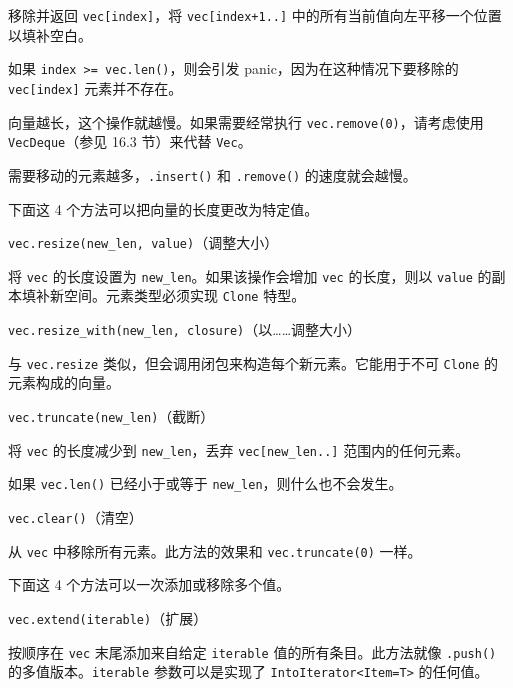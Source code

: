 移除并返回 \texttt{vec[index]}，将 \texttt{vec[index+1..]} 中的所有当前值向左平移一个位置以填补空白。

如果 \texttt{index >= vec.len()}，则会引发 panic，因为在这种情况下要移除的 \texttt{vec[index]} 元素并不存在。

向量越长，这个操作就越慢。如果需要经常执行 \texttt{vec.remove(0)}，请考虑使用 \texttt{VecDeque}（参见 16.3 节）来代替 \texttt{Vec}。

需要移动的元素越多，\texttt{.insert()} 和 \texttt{.remove()} 的速度就会越慢。

下面这 4 个方法可以把向量的长度更改为特定值。

\begin{myNote}
\texttt{vec.resize(new\_len, value)}（调整大小）
\end{myNote}

将 \texttt{vec} 的长度设置为 \texttt{new\_len}。如果该操作会增加 \texttt{vec} 的长度，则以 \texttt{value} 的副本填补新空间。元素类型必须实现 \texttt{Clone} 特型。

\begin{myNote}
\texttt{vec.resize\_with(new\_len, closure)}（以……调整大小）
\end{myNote}

与 \texttt{vec.resize} 类似，但会调用闭包来构造每个新元素。它能用于不可 \texttt{Clone} 的元素构成的向量。

\begin{mySidenote}
\texttt{vec.truncate(new\_len)}（截断）
\end{mySidenote}

将 \texttt{vec} 的长度减少到 \texttt{new\_len}，丢弃 \texttt{vec[new\_len..]} 范围内的任何元素。

如果 \texttt{vec.len()} 已经小于或等于 \texttt{new\_len}，则什么也不会发生。

\begin{mySidenote}
\texttt{vec.clear()}（清空）
\end{mySidenote}

从 \texttt{vec} 中移除所有元素。此方法的效果和 \texttt{vec.truncate(0)} 一样。

下面这 4 个方法可以一次添加或移除多个值。

\begin{mySidenote}
\texttt{vec.extend(iterable)}（扩展）
\end{mySidenote}

按顺序在 \texttt{vec} 末尾添加来自给定 \texttt{iterable} 值的所有条目。此方法就像 \texttt{.push()} 的多值版本。\texttt{iterable} 参数可以是实现了 \texttt{IntoIterator<Item=T>} 的任何值。

